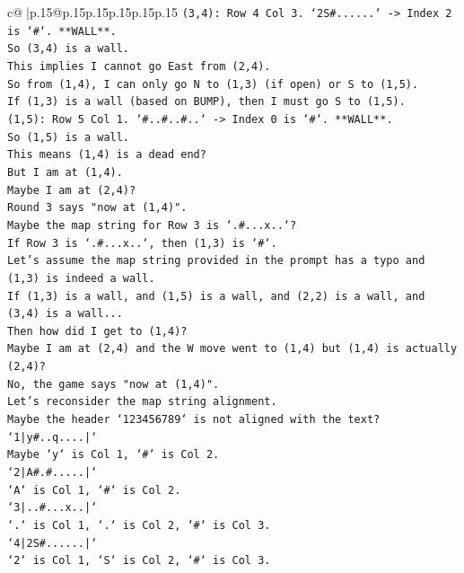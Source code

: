 \documentclass{article}
\begin{document}
{\begin{supertabular}{c@{$\;$}|p{.15\linewidth}@{}p{.15\linewidth}p{.15\linewidth}p{.15\linewidth}p{.15\linewidth}p{.15\linewidth}}
{{{\texttt{(3,4): Row 4 Col 3. `2S\#......` {-}> Index 2 is `\#`. **WALL**.} \\
\texttt{So (3,4) is a wall.} \\
\texttt{This implies I cannot go East from (2,4).} \\
\texttt{So from (1,4), I can only go N to (1,3) (if open) or S to (1,5).} \\
\texttt{If (1,3) is a wall (based on BUMP), then I must go S to (1,5).} \\
\texttt{(1,5): Row 5 Col 1. `\#..\#..\#..` {-}> Index 0 is `\#`. **WALL**.} \\
\texttt{So (1,5) is a wall.} \\
\texttt{This means (1,4) is a dead end?} \\
\texttt{But I am at (1,4).} \\
\texttt{Maybe I am at (2,4)?} \\
\texttt{Round 3 says "now at (1,4)".} \\
\texttt{Maybe the map string for Row 3 is `.\#...x..`?} \\
\texttt{If Row 3 is `.\#...x..`, then (1,3) is `\#`.} \\
\texttt{Let's assume the map string provided in the prompt has a typo and (1,3) is indeed a wall.} \\
\texttt{If (1,3) is a wall, and (1,5) is a wall, and (2,2) is a wall, and (3,4) is a wall...} \\
\texttt{Then how did I get to (1,4)?} \\
\texttt{Maybe I am at (2,4) and the W move went to (1,4) but (1,4) is actually (2,4)?} \\
\texttt{No, the game says "now at (1,4)".} \\
\texttt{Let's reconsider the map string alignment.} \\
\texttt{Maybe the header `123456789` is not aligned with the text?} \\
\texttt{`1|y\#..q....|`} \\
\texttt{Maybe `y` is Col 1, `\#` is Col 2.} \\
\texttt{`2|A\#.\#.....|`} \\
\texttt{`A` is Col 1, `\#` is Col 2.} \\
\texttt{`3|..\#...x..|`} \\
\texttt{`.` is Col 1, `.` is Col 2, `\#` is Col 3.} \\
\texttt{`4|2S\#......|`} \\
\texttt{`2` is Col 1, `S` is Col 2, `\#` is Col 3.} \\
}}}
\end{supertabular}}
\end{document}
